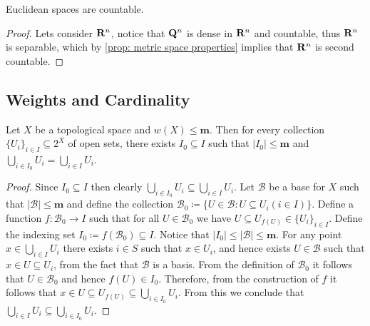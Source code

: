 \begin{corollary}
    \label{cor:euclidean-space-second-countable}
    Euclidean spaces are countable.
\end{corollary}

\begin{proof}
    Lets consider \(\mathbf{R}^n\), notice that \(\mathbf{Q}^n\) is dense in \(\mathbf{R}^n\) and countable,
    thus \(\mathbf{R}^n\) is separable, which by \cref{prop: metric space properties}
    implies that \(\mathbf{R}^n\) is second countable.
\end{proof}

\subsection{Weights and Cardinality}

\begin{proposition}\label{prop: weight m space subset union}
    Let \(X\) be a topological space and \(w(X) \leq \mathbf m\). Then for every
    collection \(\{U_i\}_{i \in I} \subseteq 2^X\) of open sets, there exists
    \(I_0 \subseteq I\) such that \(|I_0| \leq \mathbf m\) and \(\bigcup_{i \in
        I_0} U_i = \bigcup_{i \in  I} U_i\).
\end{proposition}

\begin{proof}
    Since \(I_0 \subseteq I\) then clearly \(\bigcup_{i \in  I_0} U_i \subseteq
    \bigcup_{i \in  I} U_i\). Let \(\mathcal B\) be a base for \(X\) such that
    \(|\mathcal B| \leq \mathbf m\) and define the collection \(\mathcal B_0 \coloneq
    \{U \in \mathcal B \colon U \subseteq U_i (i \in I)\}\). Define a function \(f:
    \mathcal B_0 \to I\) such that for all \(U \in \mathcal B_0\) we have \(U
    \subseteq  U_{f(U)} \in \{U_i\}_{i \in I}\). Define the indexing set \(I_0 \coloneq
    f(\mathcal B_0) \subseteq I\). Notice that \(|I_0| \leq |\mathcal B| \leq
    \mathbf m\). For any point \(x \in \bigcup_{i \in  I} U_i\) there exists \(i
    \in S\) such that \(x \in U_i\), and hence exists \(U \in \mathcal B\) such
    that \(x \in U \subseteq U_i\), from the fact that \(\mathcal B\) is a basis.
    From the definition of \(\mathcal B_0\) it follows that \(U \in \mathcal B_0\)
    and hence \(f(U) \in I_0\). Therefore, from the construction of \(f\) it
    follows that \(x \in U \subseteq U_{f(U)} \subseteq \bigcup_{i \in  I_0}
    U_i\). From this we conclude that \(\bigcup_{i \in  I} U_i \subseteq
    \bigcup_{i \in  I_0} U_i\).
\end{proof}

